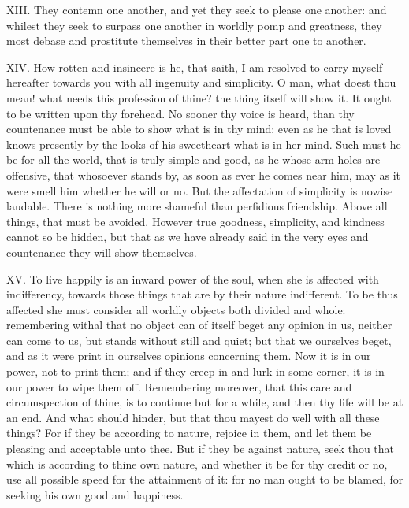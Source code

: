 XIII. They contemn one another, and yet they seek to please one another:
and whilest they seek to surpass one another in worldly pomp and
greatness, they most debase and prostitute themselves in their better part
one to another.

XIV. How rotten and insincere is he, that saith, I am resolved to carry
myself hereafter towards you with all ingenuity and simplicity. O man,
what doest thou mean! what needs this profession of thine? the thing
itself will show it. It ought to be written upon thy forehead. No sooner
thy voice is heard, than thy countenance must be able to show what is in
thy mind: even as he that is loved knows presently by the looks of his
sweetheart what is in her mind. Such must he be for all the world, that is
truly simple and good, as he whose arm-holes are offensive, that whosoever
stands by, as soon as ever he comes near him, may as it were smell him
whether he will or no. But the affectation of simplicity is nowise
laudable. There is nothing more shameful than perfidious friendship. Above
all things, that must be avoided. However true goodness, simplicity, and
kindness cannot so be hidden, but that as we have already said in the very
eyes and countenance they will show themselves.

XV. To live happily is an inward power of the soul, when she is affected
with indifferency, towards those things that are by their nature
indifferent. To be thus affected she must consider all worldly objects
both divided and whole: remembering withal that no object can of itself
beget any opinion in us, neither can come to us, but stands without still
and quiet; but that we ourselves beget, and as it were print in ourselves
opinions concerning them. Now it is in our power, not to print them; and
if they creep in and lurk in some corner, it is in our power to wipe them
off. Remembering moreover, that this care and circumspection of thine, is
to continue but for a while, and then thy life will be at an end. And what
should hinder, but that thou mayest do well with all these things? For if
they be according to nature, rejoice in them, and let them be pleasing and
acceptable unto thee. But if they be against nature, seek thou that which
is according to thine own nature, and whether it be for thy credit or no,
use all possible speed for the attainment of it: for no man ought to be
blamed, for seeking his own good and happiness.

